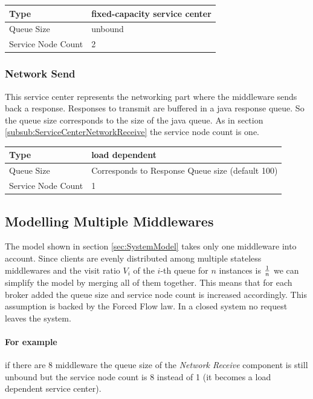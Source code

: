 \documentclass[a4paper]{article}
\begin{document}
\begin{tabular}{|l|l|}
\hline 
Type & fixed-capacity service center \\ 
\hline 
Queue Size & unbound \\ 
\hline 
Service Node Count & 2 \\ 
\hline 
\end{tabular} 


\subsubsection{Network Send}
This service center represents the networking part where the middleware sends back a response. Responses to transmit are buffered in a java response queue. So the queue size corresponds to the size of the java queue. As in section  \ref{subsub:ServiceCenterNetworkReceive} the service node count is one. \\

\begin{tabular}{|l|l|}
\hline 
Type & load dependent \\ 
\hline 
Queue Size & Corresponds to Response Queue size (default 100)\\ 
\hline 
Service Node Count & 1 \\ 
\hline 
\end{tabular} 

\subsection{Modelling Multiple Middlewares}

The model shown in section \ref{sec:SystemModel} takes only one middleware into account. Since clients are evenly distributed among multiple stateless middlewares and the visit ratio $V_i$ of the $i$-th queue for $n$ instances is $1 \over n$ we can simplify the model by merging all of them together. This means that for each broker added the queue size and service node count is increased accordingly. This assumption is backed by the Forced Flow law. In a closed system no request leaves the system.

\paragraph{For example} if there are 8 middleware the queue size of the \textit{Network Receive} component is still unbound but the service node count is 8 instead of 1 (it becomes a load dependent service center).
\end{document}
